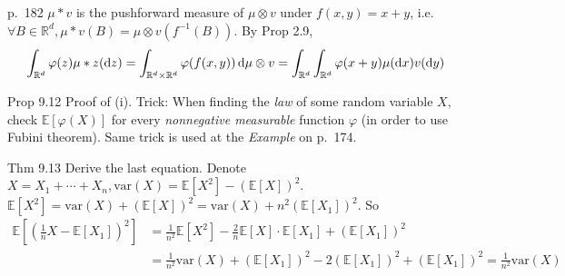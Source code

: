 \begin{note}{p.~182}
    $\mu *v$ is the pushforward measure of $\mu\otimes v$ under $f(x,y)=x+y$, i.e. $\forall B\in \mathbb{R}^d, \mu *v(B)=\mu\otimes v (f^{-1}(B))$. By Prop 2.9,
    \[
    \int_{\mathbb{R}^d} \varphi(z)\mu*z(\mathop{}\!\mathrm{d} z)
    =\int_{\mathbb{R}^d\times \mathbb{R}^d}\varphi(f(x,y))\mathop{}\!\mathrm{d} \mu\otimes v
    =\int_{\mathbb{R}^d}\int_{\mathbb{R}^d}\varphi(x+y)\mu(\mathop{}\!\mathrm{d} x)v(\mathop{}\!\mathrm{d} y)
    \]
\end{note}

\begin{note}{Prop 9.12}
    Proof of (i). Trick: When finding the \emph{law} of some random variable $X$, check $\mathbb{E}[\varphi(X)]$ for every \emph{nonnegative measurable} function $\varphi$ (in order to use Fubini theorem). Same trick is used at the \emph{Example} on p.~174.
\end{note}

\begin{note}{Thm 9.13}
    Derive the last equation. Denote $X=X_1+\cdots +X_n, \text{var}(X)=\mathbb{E}[X^2]-(\mathbb{E}[X])^2$. $\mathbb{E}[X^2]=\text{var}(X)+(\mathbb{E}[X])^2=\text{var}(X)+n^2(\mathbb{E}[X_1])^2$. So
    \[
    \begin{aligned}
    \mathbb{E}\left[
    \left(
    \frac{1}{n}X-\mathbb{E}[X_1]
    \right)^2
    \right]
    &=\frac{1}{n^2}\mathbb{E}[X^2]-\frac{2}{n}\mathbb{E}[X]\cdot\mathbb{E}[X_1]+(\mathbb{E}[X_1])^2\\
    &=\frac{1}{n^2}\text{var}(X)+(\mathbb{E}[X_1])^2-2(\mathbb{E}[X_1])^2+(\mathbb{E}[X_1])^2=\frac{1}{n^2}\text{var}(X) 
    \end{aligned}
    \]
\end{note}

